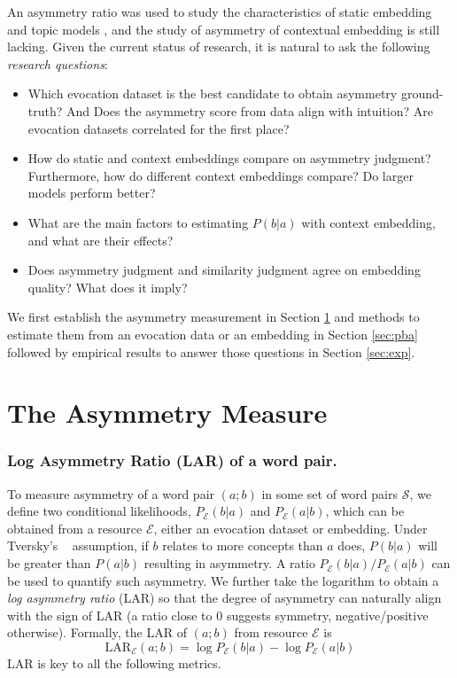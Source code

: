 \documentclass[letterpaper]{article} %
\begin{document}
An asymmetry ratio was used to study the characteristics of static embedding \cite{nematzadeh2017evaluating} and topic models \cite{griffiths2007topics}, and the study of asymmetry of contextual embedding is still lacking. Given the current status of research, it is natural to ask the following \textit{research questions}:
\begin{itemize}
    \item
     Which evocation dataset is the best candidate to obtain asymmetry ground-truth? And  Does the asymmetry score from data align with intuition?  Are evocation datasets correlated for the first place?
    \item
     How do static and context embeddings compare on asymmetry judgment? Furthermore, how do different context embeddings compare? Do larger models perform better?
    \item
     What are the main factors to estimating $P(b|a)$ with context embedding, and what are their effects?
    \item
     Does asymmetry judgment and similarity judgment agree on embedding quality? What does it imply?
\end{itemize}

We first establish the asymmetry measurement in Section \ref{sec:asy_measure} and methods to estimate them from an evocation data or an embedding in Section \ref{sec:pba} followed by empirical results to answer those questions in Section \ref{sec:exp}.

\section{The Asymmetry Measure}
\label{sec:asy_measure}
\subsubsection{Log Asymmetry Ratio (LAR) of a word pair.} To measure asymmetry of a word pair $(a;b)$ in some set of word pairs $\mathcal{S}$, we define two conditional likelihoods, $P_\mathcal{E}(b|a)$ and $P_\mathcal{E}(a|b)$, which can be obtained from a resource $\mathcal{E}$, either an evocation dataset or embedding. Under Tversky's ~ assumption, if $b$ relates to more concepts than $a$ does, $P(b|a)$ will be greater than $P(a|b)$ resulting in asymmetry. A ratio $P_\mathcal{E}(b|a)/P_\mathcal{E}(a|b)$ \cite{griffiths2007topics} can be used to quantify such asymmetry. We further take the logarithm to obtain a \textit{log asymmetry ratio} (LAR) so that the degree of asymmetry can naturally align with the sign of LAR (a ratio close to 0 suggests symmetry, negative/positive otherwise). Formally, the LAR of $(a;b)$ from resource $\mathcal{E}$ is
\begin{equation}
\label{eq:lar}
    \mbox{LAR}_\mathcal{E}(a;b) = \log P_\mathcal{E}(b|a) - \log P_\mathcal{E}(a|b)
\end{equation}
LAR is key to all the following metrics.
\end{document}
